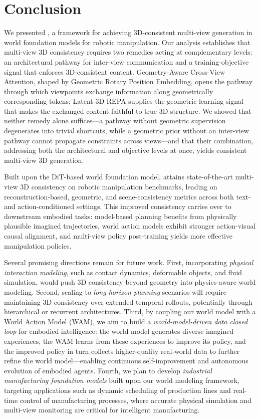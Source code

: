 \section{Conclusion}
\label{sec:conclusion}

We presented \methodname{}, a framework for achieving 3D-consistent multi-view generation in world foundation models for robotic manipulation. Our analysis establishes that multi-view 3D consistency requires two remedies acting at complementary levels: an architectural pathway for inter-view communication and a training-objective signal that enforces 3D-consistent content. Geometry-Aware Cross-View Attention, shaped by Geometric Rotary Position Embedding, opens the pathway through which viewpoints exchange information along geometrically corresponding tokens; Latent 3D-REPA supplies the geometric learning signal that makes the exchanged content faithful to true 3D structure. We showed that neither remedy alone suffices---a pathway without geometric supervision degenerates into trivial shortcuts, while a geometric prior without an inter-view pathway cannot propagate constraints across views---and that their combination, addressing both the architectural and objective levels at once, yields consistent multi-view 3D generation.

Built upon the DiT-based world foundation model, \methodname{} attains state-of-the-art multi-view 3D consistency on robotic manipulation benchmarks, leading on reconstruction-based, geometric, and scene-consistency metrics across both text- and action-conditioned settings. This improved consistency carries over to downstream embodied tasks: model-based planning benefits from physically plausible imagined trajectories, world action models exhibit stronger action-visual causal alignment, and multi-view policy post-training yields more effective manipulation policies.

Several promising directions remain for future work. First, incorporating \emph{physical interaction modeling}, such as contact dynamics, deformable objects, and fluid simulation, would push 3D consistency beyond geometry into physics-aware world modeling. Second, scaling to \emph{long-horizon planning} scenarios will require maintaining 3D consistency over extended temporal rollouts, potentially through hierarchical or recurrent architectures. Third, by coupling our world model with a World Action Model (WAM), we aim to build a \emph{world-model-driven data closed loop} for embodied intelligence: the world model generates diverse imagined experiences, the WAM learns from these experiences to improve its policy, and the improved policy in turn collects higher-quality real-world data to further refine the world model---enabling continuous self-improvement and autonomous evolution of embodied agents. Fourth, we plan to develop \emph{industrial manufacturing foundation models} built upon our world modeling framework, targeting applications such as dynamic scheduling of production lines and real-time control of manufacturing processes, where accurate physical simulation and multi-view monitoring are critical for intelligent manufacturing.
